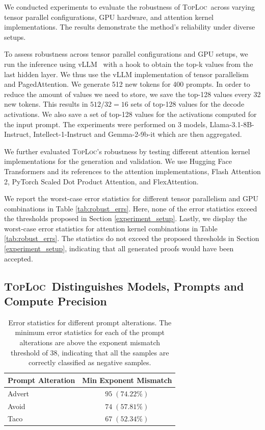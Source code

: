 \documentclass{article}
\theoremstyle{plain}
\theoremstyle{definition}
\theoremstyle{remark}
\newcommand{\toploc}{\textsc{TopLoc}}
\begin{document}
We conducted experiments to evaluate the robustness of \toploc\ across varying tensor parallel configurations, GPU hardware, and attention kernel implementations.
The results demonstrate the method's reliability under diverse setups.

To assess robustness across tensor parallel configurations and GPU setups, we run the inference using vLLM~\citep{vLLM} with a hook to obtain the top-k values from the last hidden layer.
We thus use the vLLM implementation of tensor parallelism and PagedAttention.
We generate 512 new tokens for 400 prompts.
In order to reduce the amount of values we need to store, we save the top-128 values every 32 new tokens.
This results in $512 / 32 = 16$ sets of top-128 values for the decode activations.
We also save a set of top-128 values for the activations computed for the input prompt.
The experiments were performed on 3 models, Llama-3.1-8B-Instruct, Intellect-1-Instruct and Gemma-2-9b-it which are then aggregated.

We further evaluated \toploc's robustness by testing different attention kernel implementations for the generation and validation.
We use Hugging Face Transformers and its references to the attention implementations, Flash Attention 2, PyTorch Scaled Dot Product Attention, and FlexAttention.

We report the worst-case error statistics for different tensor parallelism and GPU combinations in Table \ref{tab:robust_errs}.
Here, none of the error statistics exceed the thresholds proposed in Section \ref{experiment_setup}.
Lastly, we display the worst-case error statistics for attention kernel combinations in Table \ref{tab:robust_errs}.
The statistics do not exceed the proposed thresholds in Section \ref{experiment_setup}, indicating that all generated proofs would have been accepted.

\subsection{\toploc\ Distinguishes Models, Prompts and Compute Precision}

\begin{table}[h]
\caption{Error statistics for different prompt alterations.
The minimum error statistics for each of the prompt alterations are above the exponent mismatch threshold of $38$, indicating that all the samples are correctly classified as negative samples.
}
\vspace{6pt}
\label{tab:prompt_errs}
\begin{center}
\begin{tabular}{lc}
\toprule
Prompt Alteration & Min Exponent Mismatch \\
\midrule
Advert & $95\;(74.22\%)$ \\
Avoid & $74\;(57.81\%)$ \\
Taco & $67\;(52.34\%)$ \\
\bottomrule
\end{tabular}
\end{center}
\vspace{-12pt}
\end{table}
\end{document}
